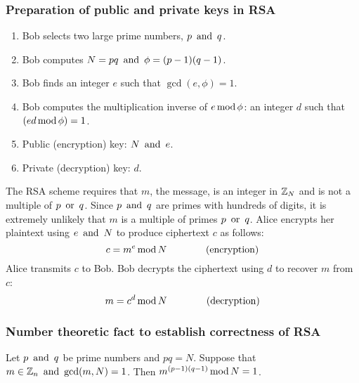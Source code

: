 \subsubsection*{Preparation of public and private keys in RSA}
\begin{enumerate}
  \item Bob selects two large prime numbers, $p \operatorname{~\text{and}~} q$.
  \item Bob computes $N = pq \operatorname{~\text{and}~} \phi = (p-1)(q-1)$.
  \item Bob finds an integer $e$ such that $\gcd(e, \phi) = 1$.
  \item Bob computes the multiplication inverse of $e \operatorname{\text{mod}} \phi$: an integer $d$ such that $(ed \operatorname{\text{mod}} \phi) = 1$.
  \item Public (encryption) key: $N \operatorname{~\text{and}~} e$.
  \item Private (decryption) key: $d$.
\end{enumerate}
The RSA scheme requires that $m$, the message, is an integer in $\mathbb{Z}_N$ and is not a multiple of $p \operatorname{~\text{or}~} q$. Since $p \operatorname{~\text{and}~} q$ are primes with hundreds of digits, it is extremely unlikely that $m$ is a multiple of primes $p \operatorname{~\text{or}~} q$. Alice encrypts her plaintext using $e \operatorname{~\text{and}~} N$ to produce ciphertext $c$ as follows:
\[
  c = m^e \operatorname{\text{mod}} N \qquad \qquad \text{(encryption)}
\]
Alice transmits $c$ to Bob. Bob decrypts the ciphertext using $d$ to recover $m$ from $c$:
\[
  m = c^d \operatorname{\text{mod}} N \qquad \qquad \text{(decryption)}
\]

\subsubsection*{Number theoretic fact to establish correctness of RSA}
Let $p \operatorname{~\text{and}~} q$ be prime numbers and $pq = N$. Suppose that $m \in \mathbb{Z}_n \operatorname{~\text{and}~} \gcd(m,N) = 1$. Then $m^{(p-1)(q-1)} \operatorname{\text{mod}} N = 1$.